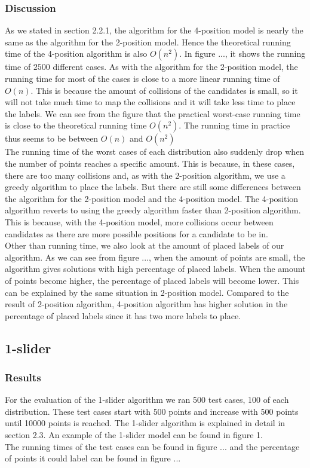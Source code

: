 \documentclass[crop=false,a4paper,oneside,11pt]{standalone}
\begin{document}
\subsubsection{Discussion}
As we stated in section 2.2.1, the algorithm for the 4-position model is nearly the same as the algorithm for the 2-position model. Hence the theoretical running time of the 4-position algorithm is also $O(n^2)$. In figure ..., it shows the running time of $2500$ different cases. As with the algorithm for the 2-position model, the running time for most of the cases is close to a more linear running time of $O(n)$. This is because the amount of collisions of the candidates is small, so it will not take much time to map the collisions and it will take less time to place the labels. We can see from the figure that the practical worst-case running time is close to the theoretical running time $O(n^2)$. The running time in practice thus seems to be between $O(n)$ and $O(n^2)$  \\
The running time of the worst cases of each distribution also suddenly drop when the number of points reaches a specific amount. This is because, in these cases, there are too many collisions and, as with the 2-position algorithm, we use a greedy algorithm to place the labels. But there are still some differences between the algorithm for the 2-position model and the 4-position model. The 4-position algorithm reverts to using the greedy algorithm faster than 2-position algorithm. This is because, with the 4-position model, more collisions occur between candidates as there are more possible positions for a candidate to be in.\\
Other than running time, we also look at the amount of placed labels of our algorithm. As we can see from figure ..., when the amount of points are small, the algorithm gives solutions with high percentage of placed labels. When the amount of points become higher, the percentage of placed labels will become lower. This can be explained by the same situation in 2-position model. Compared to the result of 2-position algorithm, 4-position algorithm has higher solution in the percentage of placed labels since it has two more labels to place.\\


\subsection{1-slider}
\subsubsection{Results}
For the evaluation of the 1-slider algorithm we ran 500 test cases, 100 of each distribution. These test cases start with 500 points and increase with 500 points until 10000 points is reached. The 1-slider algorithm is explained in detail in section 2.3. An example of the 1-slider model can be found in figure 1.\\
 The running times of the test cases can be found in figure ... and the percentage of points it could label can be found in figure ...
\end{document}
